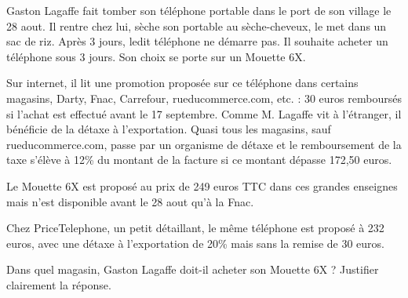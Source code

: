 
Gaston Lagaffe fait tomber son téléphone portable dans le port de son village le 28 aout. Il rentre chez lui, sèche son portable au sèche-cheveux, le met dans un sac de riz. Après 3 jours, ledit téléphone ne démarre pas. Il souhaite acheter un téléphone sous 3 jours. Son choix se porte sur un Mouette 6X.

Sur internet, il lit une promotion proposée sur ce téléphone dans certains magasins, Darty, Fnac, Carrefour, rueducommerce.com, etc. : 30 euros remboursés si l'achat est effectué avant le 17 septembre. Comme M. Lagaffe vit à l'étranger, il bénéficie de la détaxe à l'exportation. Quasi tous les magasins, sauf rueducommerce.com, passe par un organisme de détaxe et le remboursement de la taxe s'élève à 12\% du montant de la facture si ce montant dépasse 172,50 euros.

Le Mouette 6X est proposé au prix de 249 euros TTC dans ces grandes enseignes mais n'est disponible avant le 28 aout qu'à la Fnac. 

Chez PriceTelephone, un petit détaillant, le même téléphone est proposé à 232 euros, avec une détaxe à l'exportation de 20\% mais sans la remise de 30 euros.

Dans quel magasin, Gaston Lagaffe doit-il acheter son Mouette 6X ? Justifier clairement la réponse.